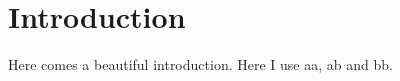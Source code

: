 \section{Introduction}
\label{ch:introduction}

Here comes a beautiful introduction.
Here I use \gls{aa}, \gls{ab} and \gls{bb}.